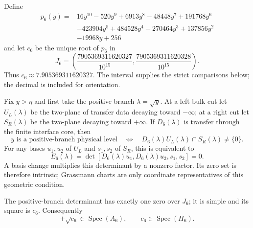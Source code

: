Define
\[
\begin{aligned}
p_6(y)={}&16y^{10}-520y^9+6913y^8-48448y^7+191768y^6\\
&-423904y^5+484528y^4-270464y^3+137856y^2\\
&-19968y+256
\end{aligned}
\]
and let \(c_6\) be the unique root of \(p_6\) in
\begin{equation}\label{eq:c6-interval}
J_6=
\left(
\frac{7905369311620327}{10^{15}},
\frac{7905369311620328}{10^{15}}
\right).
\end{equation}
Thus \(c_6\approx7.905369311620327\). The interval supplies the strict
comparisons below; the decimal is included for orientation.

Fix \(y>\eta\) and first take the positive branch
\(\lambda=\sqrt y\).  At a left bulk cut let \(U_L(\lambda)\) be the
two-plane of transfer data decaying toward \(-\infty\); at a right cut let
\(S_R(\lambda)\) be the two-plane decaying toward \(+\infty\).  If
\(D_6(\lambda)\) is transfer through the finite interface core, then
\[
y\text{ is a positive-branch physical level}
\quad\Longleftrightarrow\quad
D_6(\lambda)U_L(\lambda)\cap S_R(\lambda)\neq\{0\}.
\]
For any bases \(u_1,u_2\) of \(U_L\) and \(s_1,s_2\) of \(S_R\), this is
equivalent to
\begin{equation}\label{eq:g6-evans}
E_6(\lambda)
=\det[D_6(\lambda)u_1,D_6(\lambda)u_2,s_1,s_2]=0.
\end{equation}
A basis change multiplies this determinant by a nonzero factor.  Its zero
set is therefore intrinsic; Grassmann charts are only coordinate
representatives of this geometric condition.

\begin{lemma}\label{lem:c6-realization}
The positive-branch determinant has exactly one zero over \(J_6\); it is
simple and its square is \(c_6\).  Consequently
\[
+\sqrt{c_6}\in\operatorname{Spec}(A_6),
\qquad
c_6\in\operatorname{Spec}(H_6).
\]
\end{lemma}

